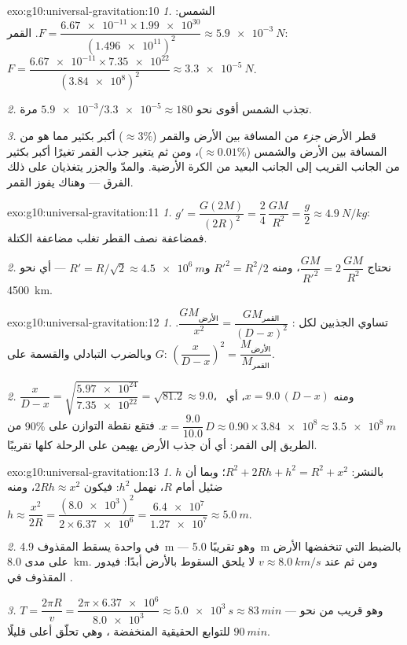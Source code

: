 \begin{solution}{exo:g10:universal-gravitation:10}
\emph{1.} الشمس:
$F = \dfrac{\num{6.67e-11} \times \num{1.99e30}}{(\num{1.496e11})^2}
\approx \qty{5.9e-3}{N}$. القمر:
$F = \dfrac{\num{6.67e-11} \times \num{7.35e22}}{(\num{3.84e8})^2}
\approx \qty{3.3e-5}{N}$.

\emph{2.} تجذب الشمس أقوى نحو $\num{5.9e-3}/\num{3.3e-5} \approx 180$
مرة.

\emph{3.} قطر الأرض \emph{جزء} من المسافة بين الأرض والقمر
($\approx 3\%$) أكبر بكثير مما هو من المسافة بين الأرض والشمس
($\approx 0.01\%$)، ومن ثم يتغير جذب القمر تغيرًا أكبر بكثير من الجانب
القريب إلى الجانب البعيد من الكرة الأرضية. والمدّ والجزر يتغذيان على ذلك الفرق ---
وهناك يفوز القمر.
\end{solution}

\begin{solution}{exo:g10:universal-gravitation:11}
\emph{1.} $g' = \dfrac{G (2M)}{(2R)^2} = \dfrac{2}{4}\,\dfrac{GM}{R^2}
= \dfrac{g}{2} \approx \qty{4.9}{N/kg}$: فمضاعفة نصف القطر تغلب
مضاعفة الكتلة.

\emph{2.} نحتاج $\dfrac{GM}{R'^2} = 2\,\dfrac{GM}{R^2}$، ومنه
$R'^2 = R^2/2$ و$R' = R/\sqrt{2} \approx \qty{4.5e6}{m}$ --- أي نحو
\qty{4500}{km}.
\end{solution}

\begin{solution}{exo:g10:universal-gravitation:12}
\emph{1.} تساوي الجذبين لكل :
$\dfrac{G M_{\text{الأرض}}}{x^2} = \dfrac{G M_{\text{القمر}}}{(D-x)^2}$.
وبالضرب التبادلي والقسمة على $G$:
$\left(\dfrac{x}{D-x}\right)^2 = \dfrac{M_{\text{الأرض}}}{M_{\text{القمر}}}$.

\emph{2.} $\dfrac{x}{D-x}
= \sqrt{\dfrac{\num{5.97e24}}{\num{7.35e22}}} = \sqrt{81.2} \approx
9.0$، ومنه $x = 9.0\,(D - x)$، أي\ $x = \dfrac{9.0}{10.0}\,D
\approx 0.90 \times \num{3.84e8} \approx \qty{3.5e8}{m}$. فتقع
نقطة التوازن على $90\%$ من الطريق إلى القمر: أي أن جذب الأرض
يهيمن على الرحلة كلها تقريبًا.
\end{solution}

\begin{solution}{exo:g10:universal-gravitation:13}
\emph{1.} بالنشر: $R^2 + 2Rh + h^2 = R^2 + x^2$؛ وبما أن $h$ ضئيل
أمام $R$، نهمل $h^2$: فيكون $2Rh \approx x^2$، ومنه
$h \approx \dfrac{x^2}{2R}
= \dfrac{(\num{8.0e3})^2}{2 \times \num{6.37e6}}
= \dfrac{\num{6.4e7}}{\num{1.27e7}} \approx \qty{5.0}{m}$.

\emph{2.} في  واحدة يسقط المقذوف \qty{4.9}{m} --- وهو تقريبًا
\qty{5.0}{m} بالضبط التي تنخفضها الأرض على مدى \qty{8.0}{km}. ومن ثم
عند $v \approx \qty{8.0}{km/s}$ لا يلحق السقوط بالأرض أبدًا: فيدور
المقذوف في .

\emph{3.} $T = \dfrac{2\pi R}{v}
= \dfrac{2\pi \times \num{6.37e6}}{\num{8.0e3}}
\approx \qty{5.0e3}{s} \approx \qty{83}{min}$ --- وهو قريب من نحو
$\qty{90}{min}$ للتوابع الحقيقية المنخفضة ، وهي تحلّق أعلى
قليلًا.
\end{solution}

